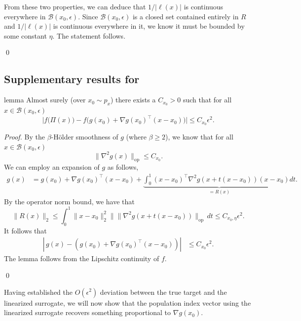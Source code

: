 \documentclass[11pt]{article}
\begin{document}
From these two properties, we can deduce that $1/|\ell(x)|$ is continuous everywhere in $\mathcal{B}(x_0,\epsilon)$. Since $\mathcal{B}(x_0,\epsilon)$ is a closed set contained entirely in $R$ and $1/|\ell(x)|$ is continuous everywhere in it, we know it must be bounded by some constant $\eta$. The statement follows.

\qed{}


\subsection{Supplementary results for }

\begin{restatable}[Approximation]{lemma}{} \label{lemma: proj approx general}
    Almost surely (over $x_0 \sim p_x$) there exists a $C_{x_0} > 0$ such that for all $x \in \mathcal{B}(x_0, \epsilon)$ 
    \[\bigg|f\big(\Pi(x)\big) - f\big(g(x_0) + \nabla g(x_0)^{\top}(x-x_0) \big)\bigg| \le C_{x_0}\epsilon^2. \]
\end{restatable}

\noindent \textit{Proof.} By the $\beta$-H\"older smoothness of $g$ (where $\beta \geq 2$), we know that for all $x \in \mathcal{B}(x_0, \epsilon)$
\[\|\nabla^2g(x)\|_{\text{op}} \leq C_{x_0}.\]
We can employ an expansion of $g$ as follows,
\begin{align*}
    g(x) &= g(x_0) + \nabla g(x_0)^{\top}(x-x_0) + \underbrace{\int_{0}^{1}(x-x_0)^{\top}\nabla^2g(x+t(x-x_0))(x-x_0) dt}_{= R(x)}.
\end{align*}
By the operator norm bound, we have that
\[\|R(x)\|_2 \leq \int_{0}^{1}\|x - x_0\|_2^2\|\|\nabla^2g(x+t(x-x_0))\|_{\text{op}} \,dt \leq C_{x_0, \eta}\epsilon^2.\]
It follows that 
\begin{align}
    \left|\,g(x) - \left(g(x_0) + \nabla g(x_0)^{\top}(x-x_0)\right)\right| &\leq C_{x_0}\epsilon^2. \label{projection second order bound}
\end{align}
The lemma follows from the Lipschitz continuity of $f$. 

\qed{}

Having established the $O(\epsilon^2)$ deviation between the true target and the linearized surrogate, we will now show that the population index vector using the linearized surrogate recovers something proportional to $\nabla g(x_0)$.  
\end{document}
